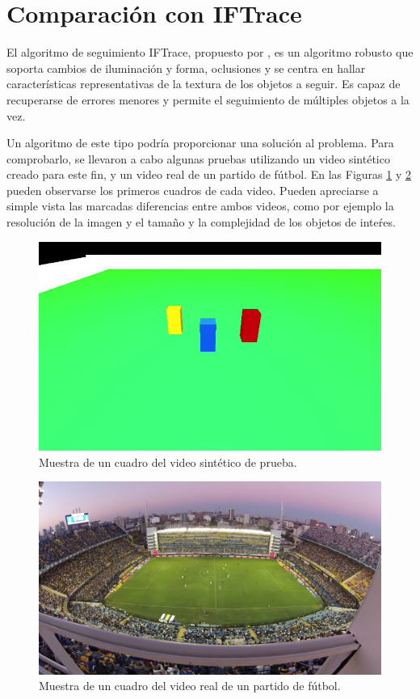 \section{Comparación con IFTrace}
\label{sec:iftrace}

El algoritmo de seguimiento IFTrace, propuesto por \citeauthor*{IFTrace}, es un
algoritmo robusto que soporta cambios de iluminación y forma, oclusiones y se
centra en hallar características representativas de la textura de los objetos a
seguir. Es capaz de recuperarse de errores menores y permite el seguimiento de
múltiples objetos a la vez.

Un algoritmo de este tipo podría proporcionar una solución al problema. Para
comprobarlo, se llevaron a cabo algunas pruebas utilizando un video sintético
creado para este fin, y un video real de un partido de fútbol. En las Figuras
\ref{fig:sample-happy-occluded} y \ref{fig:sample-boca} pueden observarse los
primeros cuadros de cada video. Pueden apreciarse a simple vista las marcadas
diferencias entre ambos videos, como por ejemplo la resolución de la imagen y
el tamaño y la complejidad de los objetos de inteŕes.

\begin{figure}[H]
    \centering
    \includegraphics[width=\linewidth]{./images/sample_happy_occluded.png}
    \caption{Muestra de un cuadro del video sintético de prueba.}
    \label{fig:sample-happy-occluded}
\end{figure}

\begin{figure}[H]
    \centering
    \includegraphics[width=\linewidth]{./images/sample_boca.png}
    \caption{Muestra de un cuadro del video real de un partido de fútbol.}
    \label{fig:sample-boca}
\end{figure}

